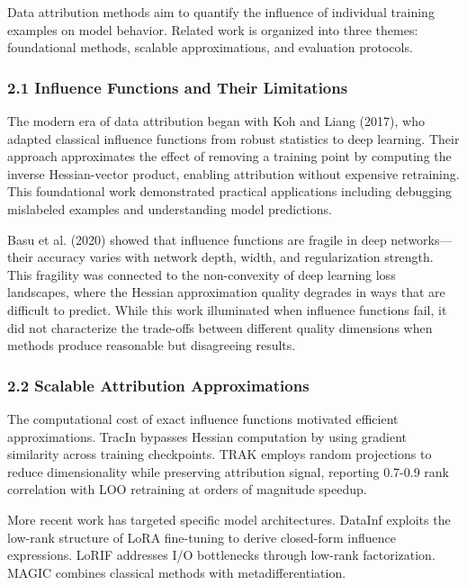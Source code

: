 
Data attribution methods aim to quantify the influence of individual training examples on model behavior. Related work is organized into three themes: foundational methods, scalable approximations, and evaluation protocols.

\subsubsection{2.1 Influence Functions and Their Limitations}

The modern era of data attribution began with Koh and Liang (2017), who adapted classical influence functions from robust statistics to deep learning. Their approach approximates the effect of removing a training point by computing the inverse Hessian-vector product, enabling attribution without expensive retraining. This foundational work demonstrated practical applications including debugging mislabeled examples and understanding model predictions.

Basu et al. (2020) showed that influence functions are fragile in deep networks---their accuracy varies with network depth, width, and regularization strength. This fragility was connected to the non-convexity of deep learning loss landscapes, where the Hessian approximation quality degrades in ways that are difficult to predict. While this work illuminated when influence functions fail, it did not characterize the trade-offs between different quality dimensions when methods produce reasonable but disagreeing results.

\subsubsection{2.2 Scalable Attribution Approximations}

The computational cost of exact influence functions motivated efficient approximations. TracIn \citep{pruthi2020tracin} bypasses Hessian computation by using gradient similarity across training checkpoints. TRAK \citep{park2023trak} employs random projections to reduce dimensionality while preserving attribution signal, reporting 0.7-0.9 rank correlation with LOO retraining at orders of magnitude speedup.

More recent work has targeted specific model architectures. DataInf \citep{kwon2023datainf} exploits the low-rank structure of LoRA fine-tuning to derive closed-form influence expressions. LoRIF \citep{li2026lorif} addresses I/O bottlenecks through low-rank factorization. MAGIC \citep{ilyas2025magic} combines classical methods with metadifferentiation.

